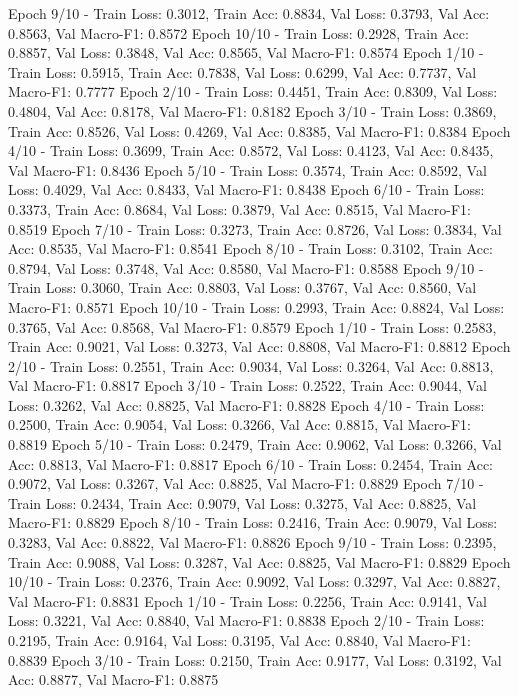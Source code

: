 \documentclass{article}
\begin{document}
Epoch 9/10 - Train Loss: 0.3012, Train Acc: 0.8834, Val Loss: 0.3793, Val Acc: 0.8563, Val Macro-F1: 0.8572
Epoch 10/10 - Train Loss: 0.2928, Train Acc: 0.8857, Val Loss: 0.3848, Val Acc: 0.8565, Val Macro-F1: 0.8574
Epoch 1/10 - Train Loss: 0.5915, Train Acc: 0.7838, Val Loss: 0.6299, Val Acc: 0.7737, Val Macro-F1: 0.7777
Epoch 2/10 - Train Loss: 0.4451, Train Acc: 0.8309, Val Loss: 0.4804, Val Acc: 0.8178, Val Macro-F1: 0.8182
Epoch 3/10 - Train Loss: 0.3869, Train Acc: 0.8526, Val Loss: 0.4269, Val Acc: 0.8385, Val Macro-F1: 0.8384
Epoch 4/10 - Train Loss: 0.3699, Train Acc: 0.8572, Val Loss: 0.4123, Val Acc: 0.8435, Val Macro-F1: 0.8436
Epoch 5/10 - Train Loss: 0.3574, Train Acc: 0.8592, Val Loss: 0.4029, Val Acc: 0.8433, Val Macro-F1: 0.8438
Epoch 6/10 - Train Loss: 0.3373, Train Acc: 0.8684, Val Loss: 0.3879, Val Acc: 0.8515, Val Macro-F1: 0.8519
Epoch 7/10 - Train Loss: 0.3273, Train Acc: 0.8726, Val Loss: 0.3834, Val Acc: 0.8535, Val Macro-F1: 0.8541
Epoch 8/10 - Train Loss: 0.3102, Train Acc: 0.8794, Val Loss: 0.3748, Val Acc: 0.8580, Val Macro-F1: 0.8588
Epoch 9/10 - Train Loss: 0.3060, Train Acc: 0.8803, Val Loss: 0.3767, Val Acc: 0.8560, Val Macro-F1: 0.8571
Epoch 10/10 - Train Loss: 0.2993, Train Acc: 0.8824, Val Loss: 0.3765, Val Acc: 0.8568, Val Macro-F1: 0.8579
Epoch 1/10 - Train Loss: 0.2583, Train Acc: 0.9021, Val Loss: 0.3273, Val Acc: 0.8808, Val Macro-F1: 0.8812
Epoch 2/10 - Train Loss: 0.2551, Train Acc: 0.9034, Val Loss: 0.3264, Val Acc: 0.8813, Val Macro-F1: 0.8817
Epoch 3/10 - Train Loss: 0.2522, Train Acc: 0.9044, Val Loss: 0.3262, Val Acc: 0.8825, Val Macro-F1: 0.8828
Epoch 4/10 - Train Loss: 0.2500, Train Acc: 0.9054, Val Loss: 0.3266, Val Acc: 0.8815, Val Macro-F1: 0.8819
Epoch 5/10 - Train Loss: 0.2479, Train Acc: 0.9062, Val Loss: 0.3266, Val Acc: 0.8813, Val Macro-F1: 0.8817
Epoch 6/10 - Train Loss: 0.2454, Train Acc: 0.9072, Val Loss: 0.3267, Val Acc: 0.8825, Val Macro-F1: 0.8829
Epoch 7/10 - Train Loss: 0.2434, Train Acc: 0.9079, Val Loss: 0.3275, Val Acc: 0.8825, Val Macro-F1: 0.8829
Epoch 8/10 - Train Loss: 0.2416, Train Acc: 0.9079, Val Loss: 0.3283, Val Acc: 0.8822, Val Macro-F1: 0.8826
Epoch 9/10 - Train Loss: 0.2395, Train Acc: 0.9088, Val Loss: 0.3287, Val Acc: 0.8825, Val Macro-F1: 0.8829
Epoch 10/10 - Train Loss: 0.2376, Train Acc: 0.9092, Val Loss: 0.3297, Val Acc: 0.8827, Val Macro-F1: 0.8831
Epoch 1/10 - Train Loss: 0.2256, Train Acc: 0.9141, Val Loss: 0.3221, Val Acc: 0.8840, Val Macro-F1: 0.8838
Epoch 2/10 - Train Loss: 0.2195, Train Acc: 0.9164, Val Loss: 0.3195, Val Acc: 0.8840, Val Macro-F1: 0.8839
Epoch 3/10 - Train Loss: 0.2150, Train Acc: 0.9177, Val Loss: 0.3192, Val Acc: 0.8877, Val Macro-F1: 0.8875
\end{document}
